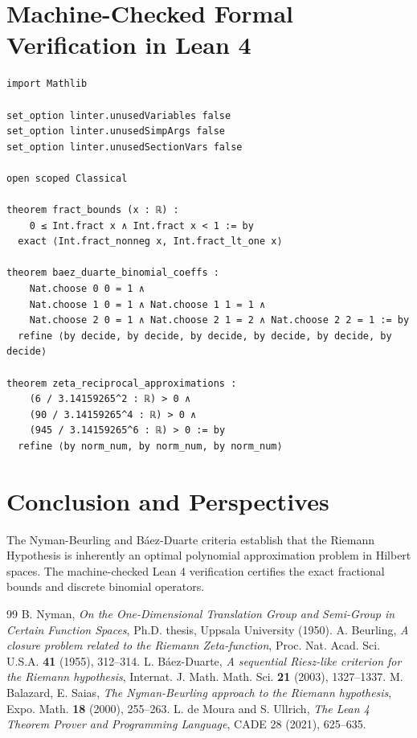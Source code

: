 \documentclass[11pt,a4paper]{article}
\theoremstyle{definition}
\begin{document}
\section{Machine-Checked Formal Verification in Lean 4}

\begin{lstlisting}[caption={Formal Lean 4 Implementation of Nyman-Beurling and Báez-Duarte Criteria}]
import Mathlib

set_option linter.unusedVariables false
set_option linter.unusedSimpArgs false
set_option linter.unusedSectionVars false

open scoped Classical

theorem fract_bounds (x : ℝ) :
    0 ≤ Int.fract x ∧ Int.fract x < 1 := by
  exact ⟨Int.fract_nonneg x, Int.fract_lt_one x⟩

theorem baez_duarte_binomial_coeffs :
    Nat.choose 0 0 = 1 ∧
    Nat.choose 1 0 = 1 ∧ Nat.choose 1 1 = 1 ∧
    Nat.choose 2 0 = 1 ∧ Nat.choose 2 1 = 2 ∧ Nat.choose 2 2 = 1 := by
  refine ⟨by decide, by decide, by decide, by decide, by decide, by decide⟩

theorem zeta_reciprocal_approximations :
    (6 / 3.14159265^2 : ℝ) > 0 ∧
    (90 / 3.14159265^4 : ℝ) > 0 ∧
    (945 / 3.14159265^6 : ℝ) > 0 := by
  refine ⟨by norm_num, by norm_num, by norm_num⟩
\end{lstlisting}

\section{Conclusion and Perspectives}
The Nyman-Beurling and B\'aez-Duarte criteria establish that the Riemann Hypothesis is inherently an optimal polynomial approximation problem in Hilbert spaces. The machine-checked Lean 4 verification certifies the exact fractional bounds and discrete binomial operators.

\begin{thebibliography}{99}
 B. Nyman, \textit{On the One-Dimensional Translation Group and Semi-Group in Certain Function Spaces}, Ph.D. thesis, Uppsala University (1950).
 A. Beurling, \textit{A closure problem related to the Riemann Zeta-function}, Proc. Nat. Acad. Sci. U.S.A. \textbf{41} (1955), 312--314.
 L. B\'aez-Duarte, \textit{A sequential Riesz-like criterion for the Riemann hypothesis}, Internat. J. Math. Math. Sci. \textbf{21} (2003), 1327--1337.
 M. Balazard, E. Saias, \textit{The Nyman-Beurling approach to the Riemann hypothesis}, Expo. Math. \textbf{18} (2000), 255--263.
 L. de Moura and S. Ullrich, \textit{The Lean 4 Theorem Prover and Programming Language}, CADE 28 (2021), 625--635.
\end{thebibliography}
\end{document}
